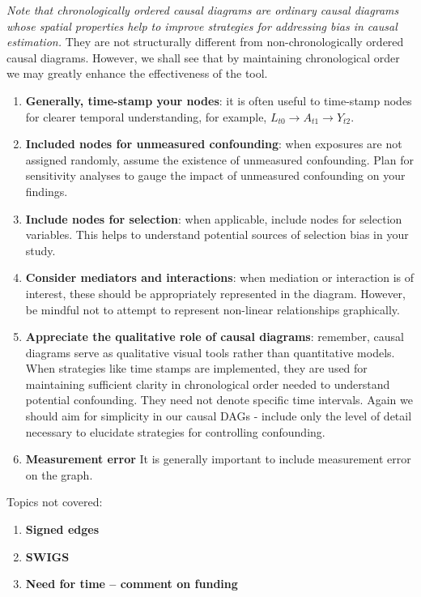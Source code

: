 \documentclass[
  singlecolumn]{report}
\providecommand{\tightlist}{%
  \setlength{\itemsep}{0pt}\setlength{\parskip}{0pt}}\usepackage{longtable,booktabs,array}
\begin{document}
\emph{Note that chronologically ordered causal diagrams are ordinary
causal diagrams whose spatial properties help to improve strategies for
addressing bias in causal estimation.} They are not structurally
different from non-chronologically ordered causal diagrams. However, we
shall see that by maintaining chronological order we may greatly enhance
the effectiveness of the tool.

\begin{enumerate}
\def\labelenumi{\arabic{enumi}.}
\setcounter{enumi}{5}
\item
  \textbf{Generally, time-stamp your nodes}: it is often useful to
  time-stamp nodes for clearer temporal understanding, for example,
  \(L_{t0} \rightarrow A_{t1} \rightarrow Y_{t2}\).
\item
  \textbf{Included nodes for unmeasured confounding}: when exposures are
  not assigned randomly, assume the existence of unmeasured confounding.
  Plan for sensitivity analyses to gauge the impact of unmeasured
  confounding on your findings.
\item
  \textbf{Include nodes for selection}: when applicable, include nodes
  for selection variables. This helps to understand potential sources of
  selection bias in your study.
\item
  \textbf{Consider mediators and interactions}: when mediation or
  interaction is of interest, these should be appropriately represented
  in the diagram. However, be mindful not to attempt to represent
  non-linear relationships graphically.
\item
  \textbf{Appreciate the qualitative role of causal diagrams}: remember,
  causal diagrams serve as qualitative visual tools rather than
  quantitative models. When strategies like time stamps are implemented,
  they are used for maintaining sufficient clarity in chronological
  order needed to understand potential confounding. They need not denote
  specific time intervals. Again we should aim for simplicity in our
  causal DAGs - include only the level of detail necessary to elucidate
  strategies for controlling confounding.
\item
  \textbf{Measurement error} It is generally important to include
  measurement error on the graph.
\end{enumerate}

Topics not covered:

\begin{enumerate}
\def\labelenumi{\arabic{enumi}.}
\tightlist
\item
  \textbf{Signed edges}
\item
  \textbf{SWIGS}
\item
  \textbf{Need for time -- comment on funding}
\end{enumerate}
\end{document}
